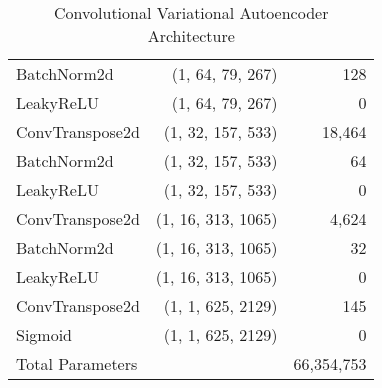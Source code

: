 \begin{table}[!h]
\begin{tabular}{lrr}
        BatchNorm2d & (1, 64, 79, 267) & 128 \\
        LeakyReLU & (1, 64, 79, 267) & 0 \\
        ConvTranspose2d & (1, 32, 157, 533) & 18,464 \\
        BatchNorm2d & (1, 32, 157, 533) & 64 \\
        LeakyReLU & (1, 32, 157, 533) & 0 \\
        ConvTranspose2d & (1, 16, 313, 1065) & 4,624 \\
        BatchNorm2d & (1, 16, 313, 1065) & 32 \\
        LeakyReLU & (1, 16, 313, 1065) & 0 \\
        ConvTranspose2d & (1, 1, 625, 2129) & 145 \\
        Sigmoid & (1, 1, 625, 2129) & 0 \\
        \midrule
        Total Parameters & & 66,354,753 \\
        \bottomrule
    \end{tabular}
    \caption{Convolutional Variational Autoencoder Architecture}
    \label{tab:cvae}
\end{table}


